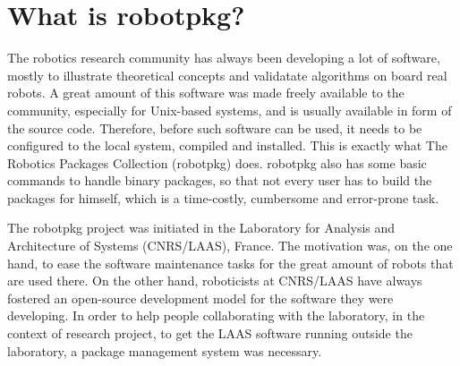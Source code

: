 %
%
%
%
%

\section{What is robotpkg?} %

The robotics  research community has always been  developing a lot of software,
mostly to  illustrate theoretical concepts and  validatate algorithms  on board
real robots. A  great amount of this software  was made freely available to the
community, especially for Unix-based systems, and  is usually available in form
of the source code. Therefore, before such software can be used, it needs to be
configured to the local  system, compiled and installed.   This is exactly what
The Robotics Packages Collection (robotpkg) does.  robotpkg also has some basic
commands to handle binary  packages, so that not   every user has to  build the
packages for himself, which is a time-costly, cumbersome and error-prone task.

The  robotpkg   project was  initiated   in the   Laboratory for  Analysis  and
Architecture of Systems (CNRS/LAAS), France.   The motivation  was, on the  one
hand, to ease the software  maintenance tasks  for  the great amount of  robots
that are used there.  On  the other hand,  roboticists at CNRS/LAAS have always
fostered  an    open-source  development model   for  the   software they  were
developing.  In order to help people collaborating  with the laboratory, in the
context of research project,   to get the   LAAS software running  outside  the
laboratory, a package management system was necessary.

